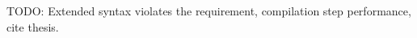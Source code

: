 \documentclass{acm_proc_article-sp}
\newcommand{\gls}[1]{#1}
\begin{document}

  
  TODO: Extended syntax violates the requirement, compilation step performance, cite thesis.

  
\end{document}
